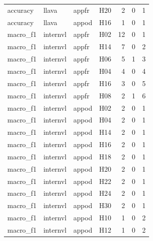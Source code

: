 \begin{table}[tbp]
\begin{tabular}{llllrrr}
accuracy & llava & appfr & H20 & 2 & 0 & 1 \\
accuracy & llava & appod & H16 & 1 & 0 & 1 \\
macro\_f1 & internvl & appfr & H02 & 12 & 0 & 1 \\
macro\_f1 & internvl & appfr & H14 & 7 & 0 & 2 \\
macro\_f1 & internvl & appfr & H06 & 5 & 1 & 3 \\
macro\_f1 & internvl & appfr & H04 & 4 & 0 & 4 \\
macro\_f1 & internvl & appfr & H16 & 3 & 0 & 5 \\
macro\_f1 & internvl & appfr & H08 & 2 & 1 & 6 \\
macro\_f1 & internvl & appod & H02 & 2 & 0 & 1 \\
macro\_f1 & internvl & appod & H04 & 2 & 0 & 1 \\
macro\_f1 & internvl & appod & H14 & 2 & 0 & 1 \\
macro\_f1 & internvl & appod & H16 & 2 & 0 & 1 \\
macro\_f1 & internvl & appod & H18 & 2 & 0 & 1 \\
macro\_f1 & internvl & appod & H20 & 2 & 0 & 1 \\
macro\_f1 & internvl & appod & H22 & 2 & 0 & 1 \\
macro\_f1 & internvl & appod & H24 & 2 & 0 & 1 \\
macro\_f1 & internvl & appod & H30 & 2 & 0 & 1 \\
macro\_f1 & internvl & appod & H10 & 1 & 0 & 2 \\
macro\_f1 & internvl & appod & H12 & 1 & 0 & 2 \\
\bottomrule
\end{tabular}
\end{table}
